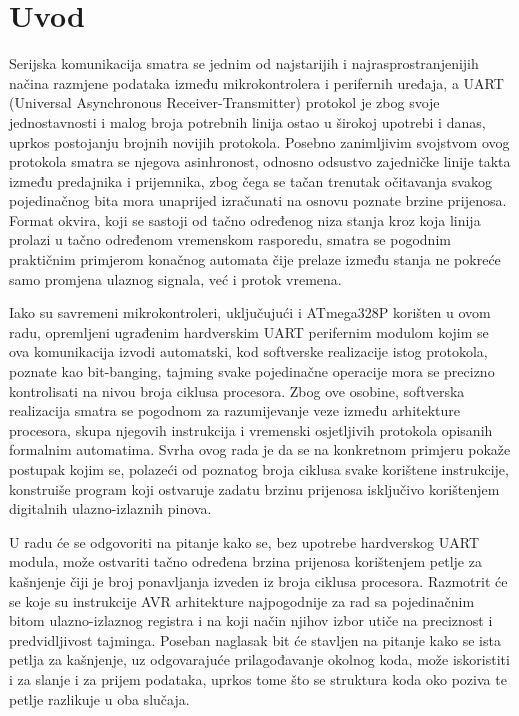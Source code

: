 %
%
{}
\chapter*{Uvod}
\label{chap:intro}
%
%
Serijska komunikacija smatra se jednim od najstarijih i
najrasprostranjenijih načina razmjene podataka između mikrokontrolera i
perifernih uređaja, a \foreignlanguage{english}{UART}
(\foreignlanguage{english}{Universal Asynchronous Receiver-Transmitter})
protokol je zbog svoje jednostavnosti i malog broja potrebnih linija
ostao u širokoj upotrebi i danas, uprkos postojanju brojnih novijih
protokola. Posebno zanimljivim svojstvom ovog protokola smatra se
njegova asinhronost, odnosno odsustvo zajedničke linije takta između
predajnika i prijemnika, zbog čega se tačan trenutak očitavanja svakog
pojedinačnog bita mora unaprijed izračunati na osnovu poznate brzine
prijenosa. Format okvira, koji se sastoji od tačno određenog niza stanja
kroz koja linija prolazi u tačno određenom vremenskom rasporedu, smatra
se pogodnim praktičnim primjerom konačnog automata čije prelaze između
stanja ne pokreće samo promjena ulaznog signala, već i protok vremena.

Iako su savremeni mikrokontroleri, uključujući i
\foreignlanguage{english}{ATmega328P} korišten u ovom radu, opremljeni
ugrađenim hardverskim \foreignlanguage{english}{UART} perifernim
modulom kojim se ova komunikacija izvodi automatski, kod softverske
realizacije istog protokola, poznate kao \foreignlanguage{english}{bit-banging},
tajming svake pojedinačne operacije mora se precizno kontrolisati na
nivou broja ciklusa procesora. Zbog ove osobine, softverska realizacija
smatra se pogodnom za razumijevanje veze između arhitekture procesora,
skupa njegovih instrukcija i vremenski osjetljivih protokola opisanih
formalnim automatima. Svrha ovog rada je da se na konkretnom primjeru
pokaže postupak kojim se, polazeći od poznatog broja ciklusa svake
korištene instrukcije, konstruiše program koji ostvaruje zadatu brzinu
prijenosa isključivo korištenjem digitalnih ulazno-izlaznih pinova.

U radu će se odgovoriti na pitanje kako se, bez upotrebe hardverskog
\foreignlanguage{english}{UART} modula, može ostvariti tačno određena
brzina prijenosa korištenjem petlje za kašnjenje čiji je broj ponavljanja
izveden iz broja ciklusa procesora. Razmotrit će se koje su instrukcije
\foreignlanguage{english}{AVR} arhitekture najpogodnije za rad sa
pojedinačnim bitom ulazno-izlaznog registra i na koji način njihov izbor
utiče na preciznost i predvidljivost tajminga. Poseban naglasak bit će
stavljen na pitanje kako se ista petlja za kašnjenje, uz odgovarajuće
prilagođavanje okolnog koda, može iskoristiti i za slanje i za prijem
podataka, uprkos tome što se struktura koda oko poziva te petlje
razlikuje u oba slučaja.

